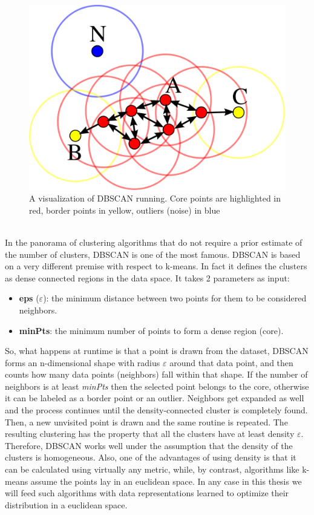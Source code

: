\begin{figure}[b!]
    \centering
    \includegraphics[width=\textwidth]{./pictures/dbscan}
    \caption{A visualization of DBSCAN running. Core points are highlighted in red, border points in yellow, outliers (noise) in blue}
    \label{fig:unet}
\end{figure}\\
\noindent In the panorama of clustering algorithms that do not require a prior estimate of the number of clusters, DBSCAN \cite{ester1996density} is one of the most famous. DBSCAN is based on a very different premise with respect to k-means. In fact it defines the clusters as dense connected regions in the data space. It takes 2 parameters as input:
\begin{itemize}
  \item \textbf{eps} ($\varepsilon$): the minimum distance between two points for them to be considered neighbors.
  \item \textbf{minPts}: the minimum number of points to form a dense region (core).
\end{itemize}
So, what happens at runtime is that a point is drawn from the dataset, DBSCAN forms an n-dimensional shape with radius $\varepsilon$ around that data point, and then counts how many data points (neighbors) fall within that shape. If the number of neighbors is at least \textit{minPts} then the selected point belongs to the core, otherwise it can be labeled as a border point or an outlier. Neighbors get expanded as well and the process continues until the density-connected cluster is completely found. Then, a new unvisited point is drawn and the same routine is repeated. The resulting clustering has the property that all the clusters have at least density $\varepsilon$. Therefore, DBSCAN works well under the assumption that the density of the clusters is homogeneous. Also, one of the advantages of using density is that it can be calculated using virtually any metric, while, by contrast, algorithms like k-means assume the points lay in an euclidean space. In any case in this thesis we will feed such algorithms with data representations learned to optimize their distribution in a euclidean space.

